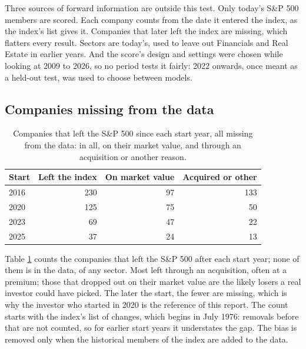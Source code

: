 \documentclass[11pt,a4paper]{article}
\begin{document}
Three sources of forward information are outside this test. Only today's S\&P 500 members are scored. Each company counts from the date it entered the index, as the index's list gives it. Companies that later left the index are missing, which flatters every result. Sectors are today's, used to leave out Financials and Real Estate in earlier years. And the score's design and settings were chosen while looking at 2009 to 2026, so no period tests it fairly: 2022 onwards, once meant as a held-out test, was used to choose between models.

\subsection{Companies missing from the data}
\begin{table}[H]
\centering
\small
\caption{Companies that left the S\&P 500 since each start year, all missing from the data: in all, on their market value, and through an acquisition or another reason.}\label{tab:survivors}
\begin{tabular}{l r r r}
\hline
Start & Left the index & On market value & Acquired or other \\
\hline
2016 & 230 & 97 & 133 \\
2020 & 125 & 75 & 50 \\
2023 & 69 & 47 & 22 \\
2025 & 37 & 24 & 13 \\
\hline
\end{tabular}
\end{table}
Table \ref{tab:survivors} counts the companies that left the S\&P 500 after each start year; none of them is in the data, of any sector. Most left through an acquisition, often at a premium; those that dropped out on their market value are the likely losers a real investor could have picked. The later the start, the fewer are missing, which is why the investor who started in 2020 is the reference of this report. The count starts with the index's list of changes, which begins in July 1976: removals before that are not counted, so for earlier start years it understates the gap. The bias is removed only when the historical members of the index are added to the data.
\end{document}
